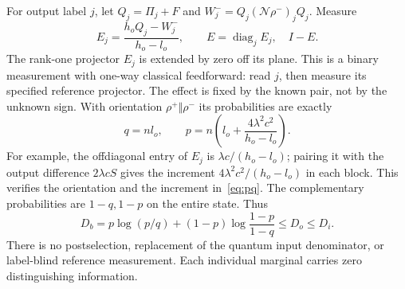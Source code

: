 \documentclass[11pt]{article}
\theoremstyle{remark}\newtheorem{remark}[theorem]{Remark}
\newcommand{\diag}{\operatorname{diag}}
\newcommand{\N}{\mathcal N}
\begin{document}
For output label $j$, let $Q_j=\Pi_j+F$ and $W_j^-=Q_j(\N\rho^-)_{j}Q_j$. Measure
\[
 E_j=\frac{h_oQ_j-W_j^-}{h_o-l_o},\qquad
 E=\diag_jE_j,\quad I-E.
\]
The rank-one projector $E_j$ is extended by zero off its plane. This is a binary measurement with one-way classical feedforward: read $j$, then measure its specified reference projector. The effect is fixed by the known pair, not by the unknown sign. With orientation $\rho^+\Vert\rho^-$ its probabilities are exactly
\begin{equation}\label{eq:pq}
 q=nl_o,\qquad p=n\left(l_o+\frac{4\lambda^2c^2}{h_o-l_o}\right).
\end{equation}
For example, the offdiagonal entry of $E_j$ is $\lambda c/(h_o-l_o)$; pairing it with the output difference $2\lambda cS$ gives the increment $4\lambda^2c^2/(h_o-l_o)$ in each block. This verifies the orientation and the increment in~\eqref{eq:pq}. The complementary probabilities are $1-q,1-p$ on the entire state. Thus
\[
 D_b=p\log(p/q)+(1-p)\log\frac{1-p}{1-q}\leq D_o\leq D_i.
\]
There is no postselection, replacement of the quantum input denominator, or label-blind reference measurement. Each individual marginal carries zero distinguishing information.
\end{document}
